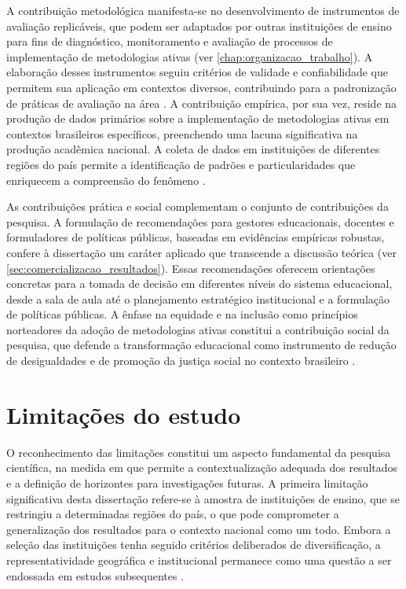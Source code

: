 A contribuição metodológica manifesta-se no desenvolvimento de instrumentos de avaliação replicáveis, que podem ser adaptados por outras instituições de ensino para fins de diagnóstico, monitoramento e avaliação de processos de implementação de metodologias ativas (ver \ref{chap:organizacao_trabalho}). A elaboração desses instrumentos seguiu critérios de validade e confiabilidade que permitem sua aplicação em contextos diversos, contribuindo para a padronização de práticas de avaliação na área \cite{LIBANEO2006}. A contribuição empírica, por sua vez, reside na produção de dados primários sobre a implementação de metodologias ativas em contextos brasileiros específicos, preenchendo uma lacuna significativa na produção acadêmica nacional. A coleta de dados em instituições de diferentes regiões do país permite a identificação de padrões e particularidades que enriquecem a compreensão do fenômeno \cite{SOUSA2025}.

As contribuições prática e social complementam o conjunto de contribuições da pesquisa. A formulação de recomendações para gestores educacionais, docentes e formuladores de políticas públicas, baseadas em evidências empíricas robustas, confere à dissertação um caráter aplicado que transcende a discussão teórica (ver \ref{sec:comercializacao_resultados}). Essas recomendações oferecem orientações concretas para a tomada de decisão em diferentes níveis do sistema educacional, desde a sala de aula até o planejamento estratégico institucional e a formulação de políticas públicas. A ênfase na equidade e na inclusão como princípios norteadores da adoção de metodologias ativas constitui a contribuição social da pesquisa, que defende a transformação educacional como instrumento de redução de desigualdades e de promoção da justiça social no contexto brasileiro \cite{TEODORO2024}.

\section{Limitações do estudo}
\label{sec:limitacoes_conclusao}

O reconhecimento das limitações constitui um aspecto fundamental da pesquisa científica, na medida em que permite a contextualização adequada dos resultados e a definição de horizontes para investigações futuras. A primeira limitação significativa desta dissertação refere-se à amostra de instituições de ensino, que se restringiu a determinadas regiões do país, o que pode comprometer a generalização dos resultados para o contexto nacional como um todo. Embora a seleção das instituições tenha seguido critérios deliberados de diversificação, a representatividade geográfica e institucional permanece como uma questão a ser endossada em estudos subsequentes \cite{LIBANEO2006}.

